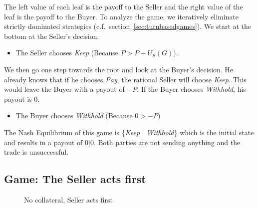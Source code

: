 \documentclass{cacthesis}
\newcommand{\authnote}[3]{{ \footnotesize \textbf{#1[#2: #3]~}}}
\newcommand{\niknote}[1]{\authnote{\color{red}}{Nikos}{#1}}
\begin{document}
The left value of each leaf is the payoff to the Seller and the right value of the leaf is the payoff to the Buyer. To analyze the game, we iteratively eliminate strictly dominated strategies (c.f.\ section~\ref{sec:turnbasedgames}). We start at the bottom at the Seller's decision.
\begin{itemize}
    \item The Seller chooses \emph{Keep} (Because $P > P - U_S(G)$).%
\end{itemize}
    We then go one step towards the root and look at the Buyer's decision. He already knows that if he chooses \emph{Pay}, the rational Seller will choose \emph{Keep}. This would leave the Buyer with a payout of $-P$. If the Buyer chooses \emph{Withhold}, his payout is $0$.
\begin{itemize}
    \item The Buyer chooses \emph{Withhold} (Because $0 > -P$)
\end{itemize} 
The Nash Equilibrium of this game is \{\emph{Keep} $|$ \emph{Withhold}\} which is the initial state and results in a payout of $0|0$. Both parties are not sending anything and the trade is unsuccessful. 

\subsection{Game: The Seller acts first} 

\begin{figure}[htb!]
\centering
\label{fig:nocol-Seller-first}
\caption{No collateral, Seller acts first}
\end{figure}
\end{document}
